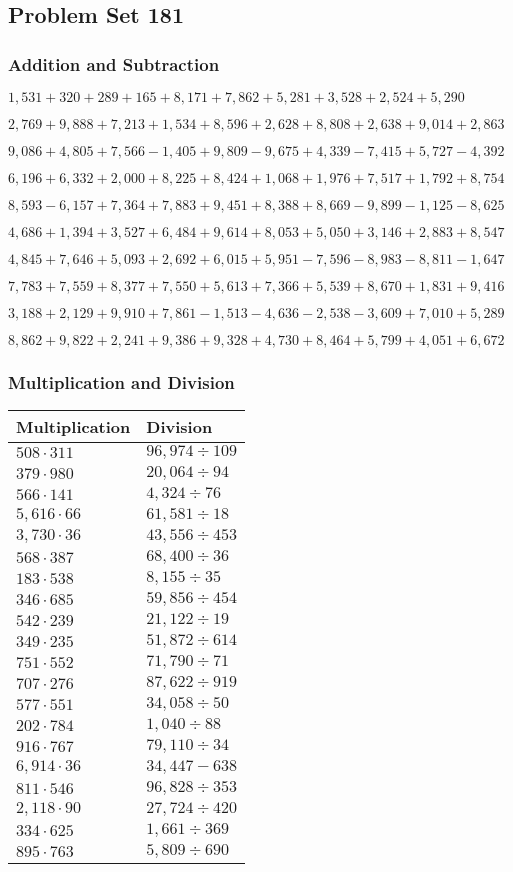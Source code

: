\hypertarget{problem-set-181}{%
\subsection{Problem Set 181}\label{problem-set-181}}

\hypertarget{addition-and-subtraction}{%
\subsubsection{Addition and
Subtraction}\label{addition-and-subtraction}}

\(1,531+320+289+165+8,171+7,862+5,281+3,528+2,524+5,290\)

\(2,769+9,888+7,213+1,534+8,596+2,628+8,808+2,638+9,014+2,863\)

\(9,086+4,805+7,566-1,405+9,809-9,675+4,339-7,415+5,727-4,392\)

\(6,196+6,332+2,000+8,225+8,424+1,068+1,976+7,517+1,792+8,754\)

\(8,593-6,157+7,364+7,883+9,451+8,388+8,669-9,899-1,125-8,625\)

\(4,686+1,394+3,527+6,484+9,614+8,053+5,050+3,146+2,883+8,547\)

\(4,845+7,646+5,093+2,692+6,015+5,951-7,596-8,983-8,811-1,647\)

\(7,783+7,559+8,377+7,550+5,613+7,366+5,539+8,670+1,831+9,416\)

\(3,188+2,129+9,910+7,861-1,513-4,636-2,538-3,609+7,010+5,289\)

\(8,862+9,822+2,241+9,386+9,328+4,730+8,464+5,799+4,051+6,672\)

\hypertarget{multiplication-and-division}{%
\subsubsection{Multiplication and
Division}\label{multiplication-and-division}}

\begin{longtable}[]{@{}ll@{}}
\toprule
Multiplication & Division\tabularnewline
\midrule
\endhead
\(508\cdot311\) & \(96,974÷109\)\tabularnewline
\(379\cdot980\) & \(20,064÷94\)\tabularnewline
\(566\cdot141\) & \(4,324÷76\)\tabularnewline
\(5,616\cdot66\) & \(61,581÷18\)\tabularnewline
\(3,730\cdot36\) & \(43,556÷453\)\tabularnewline
\(568\cdot387\) & \(68,400÷36\)\tabularnewline
\(183\cdot538\) & \(8,155÷35\)\tabularnewline
\(346\cdot685\) & \(59,856÷454\)\tabularnewline
\(542\cdot239\) & \(21,122÷19\)\tabularnewline
\(349\cdot235\) & \(51,872÷614\)\tabularnewline
\(751\cdot552\) & \(71,790÷71\)\tabularnewline
\(707\cdot276\) & \(87,622÷919\)\tabularnewline
\(577\cdot551\) & \(34,058÷50\)\tabularnewline
\(202\cdot784\) & \(1,040÷88\)\tabularnewline
\(916\cdot767\) & \(79,110÷34\)\tabularnewline
\(6,914\cdot36\) & \(34,447 - 638\)\tabularnewline
\(811\cdot546\) & \(96,828÷353\)\tabularnewline
\(2,118\cdot90\) & \(27,724÷420\)\tabularnewline
\(334\cdot625\) & \(1,661÷369\)\tabularnewline
\(895\cdot763\) & \(5,809÷690\)\tabularnewline
\bottomrule
\end{longtable}
